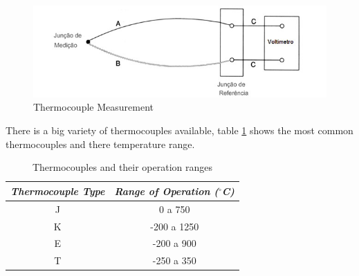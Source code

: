 	\begin{figure}[htbp]
		\centering
			\includegraphics[scale=0.75]{figuras/fig-thermocouple-measurement.jpg}
		\caption{Thermocouple Measurement \cite{termo-med}}
		\label{fig:thermocoupleMeasurement}
	\end{figure}
		
	There is a big variety of thermocouples available, table \ref{table:thermocouple} shows the most common thermocouples and there temperature range.

	\begin{table}[h!]
		\centering
		\caption{Thermocouples and their operation ranges}
		\label{table:thermocouple}
		\begin{tabular}{|c|c|}
			\hline
			\textit{\textbf{Thermocouple Type}} & \textit{\textbf{Range of Operation ($^{\circ}$C)}} \\ \hline
			J & 0 a 750 \\ \hline
			K & -200 a 1250 \\ \hline
			E & -200 a 900 \\ \hline
			T & -250 a 350 \\ \hline
		\end{tabular}
	\end{table}

